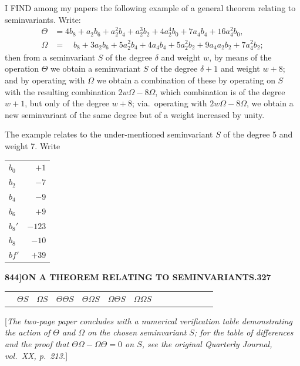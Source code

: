 \documentclass[12pt,a4paper]{article}
\theoremstyle{definition}
\begin{document}
\bigskip

\noindent I FIND among my papers the following example of a general theorem relating to seminvariants. Write:
\begin{align*}
\Theta &= 4b_8 + a_2b_6 + a_2^2b_4 + a_2^3b_2 + 4a_2^4b_0 + 7a_4b_4 + 16a_4^2b_0, \\
\Omega &= \quad b_8 + 3a_2b_6 + 5a_2^2b_4 + 4a_4b_4 + 5a_2^2b_2 + 9a_4a_2b_2 + 7a_4^2b_2;
\end{align*}
then from a seminvariant $S$ of the degree $\delta$ and weight $w$, by means of the operation $\Theta$ we obtain a seminvariant $S$ of the degree $\delta + 1$ and weight $w + 8$; and by operating with $\Omega$ we obtain a combination of these by operating on $S$ with the resulting combination $2w\Omega - 8\Omega$, which combination is of the degree $w + 1$, but only of the degree $w + 8$; via.\ operating with $2w\Omega - 8\Omega$, we obtain a new seminvariant of the same degree but of a weight increased by unity.

The example relates to the under-mentioned seminvariant $S$ of the degree 5 and weight 7. Write
\medskip
\begin{center}
\begin{tabular}{l|r}
$b_0$ & $+1$ \\
$b_2$ & $-7$ \\
$b_4$ & $-9$ \\
$b_6$ & $+9$ \\
$b_8'$ & $-123$ \\
$b_8$ & $-10$ \\
$bf'$ & $+39$
\end{tabular}
\end{center}

\newpage
\setcounter{page}{327}

\noindent\textbf{844]}\hfill\textbf{ON A THEOREM RELATING TO SEMINVARIANTS.}\hfill\textbf{327}

\bigskip

\begin{center}
\begin{tabular}{l|r|r|r|r|r|r|r|r|r|r|r|r|r}
& $\Theta S$ & $\Omega S$ & $\Theta\Theta S$ & $\Theta\Omega S$ & $\Omega\Theta S$ & $\Omega\Omega S$ & & & & & & & \\
\end{tabular}
\end{center}

\medskip

[\textit{The two-page paper concludes with a numerical verification table demonstrating the action of $\Theta$ and $\Omega$ on the chosen seminvariant $S$; for the table of differences and the proof that $\Theta\Omega - \Omega\Theta = 0$ on $S$, see the original \textit{Quarterly Journal}, vol.\ XX, p.\ 213.}]
\end{document}
